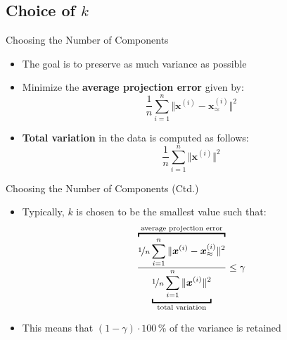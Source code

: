 \subsection{Choice of $k$}

\begin{frame}{Choosing the Number of Components}{}
	\begin{itemize}
		\item The goal is to preserve as much variance as possible
		\item Minimize the \textbf{average projection error} given by:
		\begin{equation}
			\frac{1}{n} \sum_{i=1}^n \Vert \bm{x}^{(i)} - \bm{x}_{\approx}^{(i)} \Vert^2
		\end{equation}
		\item \textbf{Total variation} in the data is computed as follows:
		\begin{equation}
			\frac{1}{n} \sum_{i=1}^n \Vert \bm{x}^{(i)} \Vert^2
		\end{equation}
	\end{itemize}
\end{frame}


\begin{frame}{Choosing the Number of Components (Ctd.)}{}
	\begin{itemize}
		\item Typically, $k$ is chosen to be the smallest value such that:
		\begin{equation}
			\frac{
				\overbracket{
					\nicefrac{1}{n} \sum_{i=1}^n \Vert \bm{x}^{(i)} - \bm{x}_{\approx}^{(i)} \Vert^2
				}^{\text{average projection error}}
			}{
				\underbracket{
					\nicefrac{1}{n} \sum_{i=1}^n \Vert \bm{x}^{(i)} \Vert^2
				}_{\text{total variation}}
			} \le \gamma
		\end{equation}
		\item This means that $(1 - \gamma) \cdot 100$\,\% of the variance is retained
	\end{itemize}
\end{frame}



